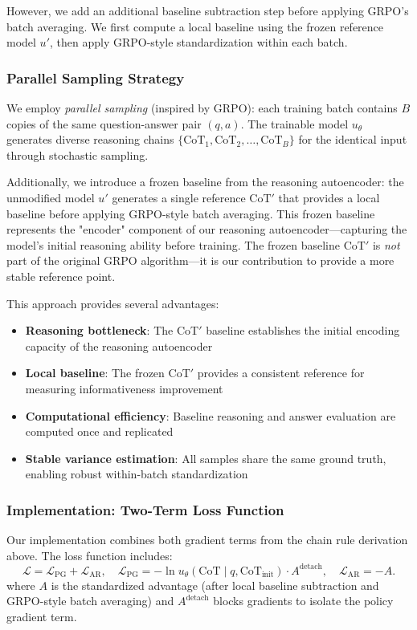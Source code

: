 \documentclass{article} %
\begin{document}
However, we add an additional baseline subtraction step before applying GRPO's batch averaging. We first compute a local baseline using the frozen reference model $u'$, then apply GRPO-style standardization within each batch.

\subsubsection{Parallel Sampling Strategy}
\label{subsubsec:parallel}
We employ \emph{parallel sampling} (inspired by GRPO): each training batch contains $B$ copies of the same question-answer pair $(q, a)$. The trainable model $u_\theta$ generates diverse reasoning chains $\{\text{CoT}_1, \text{CoT}_2, \ldots, \text{CoT}_B\}$ for the identical input through stochastic sampling.

Additionally, we introduce a frozen baseline from the reasoning autoencoder: the unmodified model $u'$ generates a single reference $\text{CoT}'$ that provides a local baseline before applying GRPO-style batch averaging. This frozen baseline represents the "encoder" component of our reasoning autoencoder—capturing the model's initial reasoning ability before training. The frozen baseline $\text{CoT}'$ is \emph{not} part of the original GRPO algorithm—it is our contribution to provide a more stable reference point.

This approach provides several advantages:
\begin{itemize}
    \item \textbf{Reasoning bottleneck}: The $\text{CoT}'$ baseline establishes the initial encoding capacity of the reasoning autoencoder
    \item \textbf{Local baseline}: The frozen $\text{CoT}'$ provides a consistent reference for measuring informativeness improvement
    \item \textbf{Computational efficiency}: Baseline reasoning and answer evaluation are computed once and replicated
    \item \textbf{Stable variance estimation}: All samples share the same ground truth, enabling robust within-batch standardization
\end{itemize}

\subsubsection{Implementation: Two-Term Loss Function}
\label{subsubsec:actor_rewards}
Our implementation combines both gradient terms from the chain rule derivation above. The loss function includes:
\[\mathcal{L}=\mathcal{L}_{\text{PG}}+\mathcal{L}_{\text{AR}},\quad
\mathcal{L}_{\text{PG}}=-\ln u_\theta(\text{CoT} \mid q, \text{CoT}_{\text{init}})\cdot A^{\text{detach}},\quad
\mathcal{L}_{\text{AR}}=-A.\]
where $A$ is the standardized advantage (after local baseline subtraction and GRPO-style batch averaging) and $A^{\text{detach}}$ blocks gradients to isolate the policy gradient term. 
\end{document}
